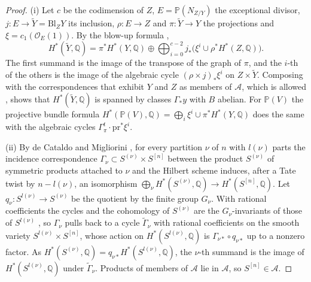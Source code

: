 \documentclass[11pt,reqno]{amsart}
\theoremstyle{plain}
\theoremstyle{definition}
\theoremstyle{remark}
\newcommand{\QQ}{\mathbb{Q}}
\newcommand{\PP}{\mathbb{P}}
\newcommand{\cO}{\mathcal{O}}
\begin{document}
\begin{proof}
(i) Let $c$ be the codimension of $Z$, $E=\PP(N_{Z/Y})$ the exceptional
divisor, $j\colon E\to\widetilde Y=\mathrm{Bl}_{Z}Y$ its inclusion,
$\rho\colon E\to Z$ and $\pi\colon\widetilde Y\to Y$ the projections and
$\xi=c_{1}(\cO_{E}(1))$. By the blow-up formula \cite[\S7.3.3]{Voi02},
\[
  H^{*}(\widetilde Y,\QQ)=\pi^{*}H^{*}(Y,\QQ)\oplus
  \bigoplus_{i=0}^{c-2}j_{*}\bigl(\xi^{i}\cup\rho^{*}H^{*}(Z,\QQ)\bigr).
\]
The first summand is the image of the transpose of the graph of $\pi$, and
the $i$-th of the others is the image of the algebraic cycle
$(\rho\times j)_{*}\xi^{i}$ on $Z\times\widetilde Y$. Composing with the
correspondences that exhibit $Y$ and $Z$ as members of $\mathcal{A}$, which is
allowed \cite[Chapter~16]{Ful98}, shows that $H^{*}(\widetilde Y,\QQ)$ is
spanned by classes $\Gamma_{*}y$ with $B$ abelian. For $\PP(V)$ the
projective bundle formula $H^{*}(\PP(V),\QQ)=\bigoplus_{i}\xi^{i}\cup
\pi^{*}H^{*}(Y,\QQ)$ \cite[\S7.3.3]{Voi02} does the same with the
algebraic cycles $\Gamma_{\pi}^{t}\cdot\mathrm{pr}^{*}\xi^{i}$.

(ii) By de Cataldo and Migliorini \cite{dCM02}, for every partition $\nu$ of
$n$ with $l(\nu)$ parts the incidence correspondence
$\Gamma_{\nu}\subset S^{(\nu)}\times S^{[n]}$ between the product
$S^{(\nu)}$ of symmetric products attached to $\nu$ and the Hilbert scheme
induces, after a Tate twist by $n-l(\nu)$, an isomorphism
$\bigoplus_{\nu}H^{*}(S^{(\nu)},\QQ)\to H^{*}(S^{[n]},\QQ)$. Let
$q_{\nu}\colon S^{l(\nu)}\to S^{(\nu)}$ be the quotient by the finite group
$G_{\nu}$. With rational coefficients the cycles and the cohomology of
$S^{(\nu)}$ are the $G_{\nu}$-invariants of those of $S^{l(\nu)}$
\cite[Example~1.7.6]{Ful98}, so $\Gamma_{\nu}$ pulls back to a cycle
$\widetilde\Gamma_{\nu}$ with rational coefficients on the smooth variety
$S^{l(\nu)}\times S^{[n]}$, whose action on $H^{*}(S^{l(\nu)},\QQ)$ is
$\Gamma_{\nu*}\circ q_{\nu*}$ up to a nonzero factor. As
$H^{*}(S^{(\nu)},\QQ)=q_{\nu*}H^{*}(S^{l(\nu)},\QQ)$, the $\nu$-th summand
is the image of $H^{*}(S^{l(\nu)},\QQ)$ under $\widetilde\Gamma_{\nu}$. Products of members of $\mathcal{A}$ lie in
$\mathcal{A}$, so $S^{[n]}\in\mathcal{A}$.


\end{proof}
\end{document}
